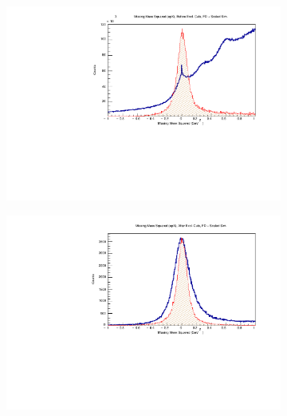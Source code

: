 \begin{figure}[!htb]
\begin{subfigure}{.45\textwidth}
                \includegraphics[width=1\textwidth]{figures/Simulation/exclusivity/hist_missing_mass_squared_epX_zoomed_prexcut_fd_Double.pdf}
            \end{subfigure}%
            \begin{subfigure}{.45\textwidth}
                \centering
                \includegraphics[width=1\textwidth]{figures/Simulation/exclusivity/hist_missing_mass_squared_epX_zoomed_excut_fd_Double.pdf}
            \end{subfigure}
            \begin{subfigure}{.45\textwidth}
                \centering

\end{subfigure}
\end{figure}
